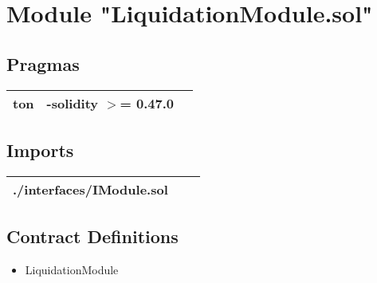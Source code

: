 
\section{Module "LiquidationModule.sol"}


\subsection{Pragmas}


\noindent\begin{tabular}{|l|l|p{5cm}|}\hline
ton & -solidity $>$= 0.47.0 &\\\hline
\end{tabular}


\subsection{Imports}


\noindent\begin{tabular}{|l|l|p{5cm}|}\hline
./interfaces/IModule.sol &\\\hline
\end{tabular}


\subsection{Contract Definitions}

\begin{itemize}
\item LiquidationModule
\end{itemize}

